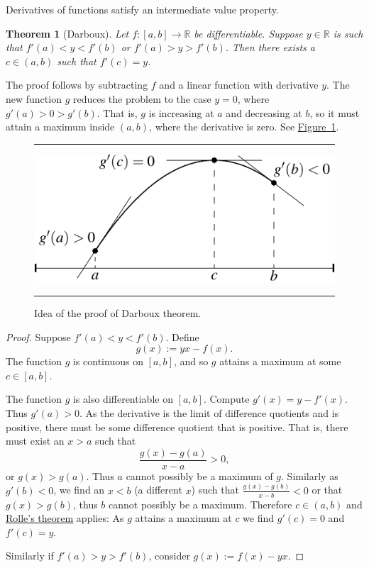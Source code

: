 \documentclass[12pt]{book}
\newenvironment{myfigureht}{%
\begin{figure}[h!t]
\noindent\rule{\textwidth}{0.4pt}\vspace{12pt}\par\centering}%
{\par\noindent\rule{\textwidth}{0.4pt}
\end{figure}}
\newcommand{\R}{{\mathbb{R}}}
\theoremstyle{plain}
\newtheorem{thm}{Theorem}[section]
\theoremstyle{remark}
\theoremstyle{definition}
\theoremstyle{exercise}
\theoremstyle{example}
\newcommand{\figureref}[1]{\hyperref[#1]{Figure~\ref*{#1}}}
\begin{document}
Derivatives of functions satisfy an
intermediate value property.

\begin{thm}[Darboux] \label{thm:darboux} 
Let $f \colon [a,b] \to \R$ be differentiable.  Suppose $y \in \R$ is such
that $f'(a) < y < f'(b)$ or
$f'(a) > y > f'(b)$.  Then there exists a $c \in (a,b)$ such that $f'(c) =
y$.
\end{thm}

The proof follows by subtracting $f$ and a linear function with derivative
$y$.  The new function $g$ reduces the problem
to the case $y=0$, where $g'(a) > 0 > g'(b)$.  That is, $g$ is increasing at $a$ and
decreasing at $b$, so it must attain a maximum inside $(a,b)$,
where the derivative is zero.  See \figureref{darbouxthmfig}.

\begin{myfigureht}
\includegraphics{figures/darbouxthmfig}
\caption{Idea of the proof of Darboux theorem.\label{darbouxthmfig}}
\end{myfigureht}

\begin{proof}
Suppose 
$f'(a) < y < f'(b)$.
Define
\begin{equation*}
g(x) := yx - f(x) .
\end{equation*}
The function $g$ is continuous on $[a,b]$, and so $g$ attains a maximum at some $c \in
[a,b]$.

The function $g$ is also differentiable on $[a,b]$.
Compute $g'(x) = y-f'(x)$.  Thus $g'(a) > 0$.  As the derivative is
the limit of difference quotients and is positive, there must be some
difference quotient that is positive.  That is, there must exist
an $x > a$ such that
\begin{equation*}
\frac{g(x)-g(a)}{x-a} > 0 ,
\end{equation*}
or $g(x) > g(a)$.  Thus $a$
cannot possibly be a maximum of $g$.  Similarly as $g'(b) < 0$,
we find an $x < b$ (a different $x$) such that
$\frac{g(x)-g(b)}{x-b} < 0$ or that $g(x) > g(b)$, thus
$b$ cannot possibly be a maximum.
Therefore $c \in (a,b)$
and \hyperref[thm:rolle]{Rolle's theorem} applies: As $g$ attains a maximum
at $c$ we find $g'(c) = 0$
and $f'(c) = y$.

Similarly if $f'(a) > y > f'(b)$, consider $g(x) := f(x)- yx$.
\end{proof}
\end{document}
